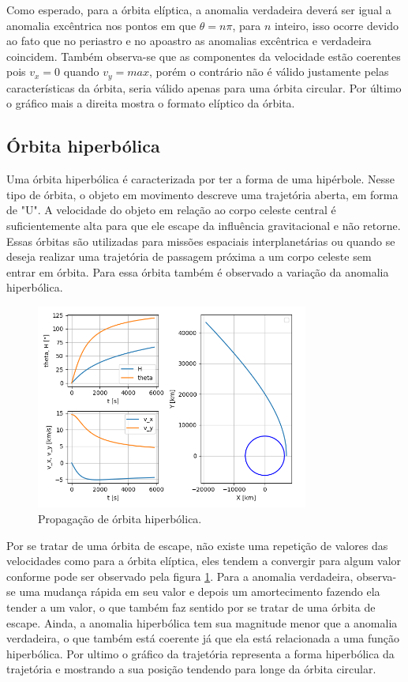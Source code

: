 Como esperado, para a órbita elíptica, a anomalia verdadeira deverá ser igual a anomalia excêntrica nos pontos em que $\theta = n\pi$, para $n$ inteiro, isso ocorre devido ao fato que no periastro e no apoastro as anomalias excêntrica e verdadeira coincidem. Também observa-se que as componentes da velocidade estão coerentes pois $v_x = 0$ quando $v_y = max$, porém o contrário não é válido justamente pelas características da órbita, seria válido apenas para uma órbita circular. Por último o gráfico mais a direita mostra o formato elíptico da órbita.

\subsection{Órbita hiperbólica}

Uma órbita hiperbólica é caracterizada por ter a forma de uma hipérbole. Nesse tipo de órbita, o objeto em movimento descreve uma trajetória aberta, em forma de "U". A velocidade do objeto em relação ao corpo celeste central é suficientemente alta para que ele escape da influência gravitacional e não retorne. Essas órbitas são utilizadas para missões espaciais interplanetárias ou quando se deseja realizar uma trajetória de passagem próxima a um corpo celeste sem entrar em órbita. Para essa órbita também é observado a variação da anomalia hiperbólica.

\begin{figure}[H]
\centering
\caption{Propagação de órbita hiperbólica.}
\label{fig: Resultado - Propagação de órbita hiperbólica}
\includegraphics[width=0.8\textwidth]{figuras/Resultados/aula6_hiperbolica.png}
\end{figure}

Por se tratar de uma órbita de escape, não existe uma repetição de valores das velocidades como para a órbita elíptica, eles tendem a convergir para algum valor conforme pode ser observado pela figura \ref{fig: Resultado - Propagação de órbita hiperbólica}. Para a anomalia verdadeira, observa-se uma mudança rápida em seu valor e depois um amortecimento fazendo ela tender a um valor, o que também faz sentido por se tratar de uma órbita de escape. Ainda, a anomalia hiperbólica tem sua magnitude menor que a anomalia verdadeira, o que também está coerente já que ela está relacionada a uma função hiperbólica. Por ultimo o gráfico da trajetória representa a forma hiperbólica da trajetória e mostrando a sua posição tendendo para longe da órbita circular.


